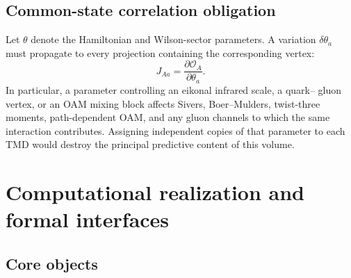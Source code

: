 \documentclass[11pt]{article}
\newcommand{\cO}{\mathcal O}
\begin{document}
\subsection{Common-state correlation obligation}

Let \(\theta\) denote the Hamiltonian and Wilson-sector parameters.  A
variation \(\delta\theta_a\) must propagate to every projection containing
the corresponding vertex:
\begin{equation}
 J_{Aa}=\frac{\partial \cO_A}{\partial\theta_a}.
\label{eq:phase-jacobian}
\end{equation}
In particular, a parameter controlling an eikonal infrared scale, a quark--
gluon vertex, or an OAM mixing block affects Sivers, Boer--Mulders, twist-three
moments, path-dependent OAM, and any gluon channels to which the same
interaction contributes.  Assigning independent copies of that parameter to
each TMD would destroy the principal predictive content of this volume.

\section{Computational realization and formal interfaces}
\label{sec:software}

\subsection{Core objects}
\end{document}
